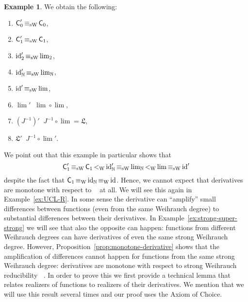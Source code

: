 \documentclass[a4paper]{amsart}
\def\IN{{\mathbb{N}}}
\def\Low{\mathfrak{L}}
\def\id{{\rm id}}
\def\C{\mbox{\rm\sffamily C}}
\def\leqW{\mathop{\leq_{\mathrm{W}}}}
\def\equivW{\mathop{\equiv_{\mathrm{W}}}}
\def\leqSW{\mathop{\leq_{\mathrm{sW}}}}
\def\equivSW{\mathop{\equiv_{\mathrm{sW}}}}
\def\lW{\mathop{<_{\mathrm{W}}}}
\theoremstyle{definition}
\newtheorem{example}[theorem]{Example}
\begin{document}
\begin{example} 
\label{ex:derivatives}
We obtain the following:
\begin{enumerate}
\item $\C_0'\equivSW\C_0$,
\item $\C_1'\equivSW\C_1$,
\item $\id_2'\equivSW\lim_2$,
\item $\id_\IN'\equivSW\lim_\IN$,
\item $\id'\equivSW\lim$,
\item $\lim'\equivSW\lim\circ\lim$,
\item $(J^{-1})'\equivSW J^{-1}\circ\lim=\Low$,
\item $\Low'\equivSW J^{-1}\circ\lim'$.
\end{enumerate}
\end{example}

We point out that this example in particular shows that 
\[\C_1'\equivSW\C_1\lW\id_\IN'\equivSW\lim\nolimits_\IN\lW\lim\equivSW\id'\]
despite the fact that $\C_1\equivW\id_\IN\equivW\id$. 
Hence, we cannot expect that derivatives are monotone with respect to $\leqW$ at all. 
We will see this again in Example~\ref{ex:UCL-R}.
In some sense the derivative can ``amplify'' small differences between functions (even from the
same Weihrauch degree) to substantial differences between their derivatives. 
In Example~\ref{ex:strong-super-strong} we will see that also the opposite can happen: functions from different
Weihrauch degrees can have derivatives of even the same strong Weihrauch degree.
However, Proposition~\ref{prop:monotone-derivative} 
shows that the amplification of differences cannot happen for functions from the same strong
Weihrauch degree: derivatives are monotone with respect to 
strong Weihrauch reducibility $\leqSW$. 
In order to prove this we first provide a technical lemma that relates realizers of functions
to realizers of their derivatives. We mention that we will use this result several times
and our proof uses the Axiom of Choice.
\end{document}
